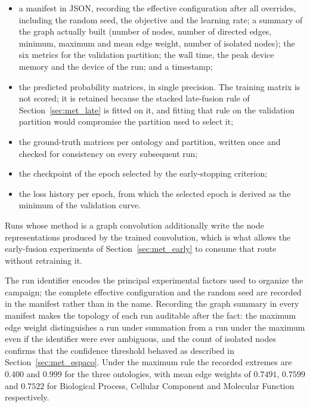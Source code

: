 \documentclass[Ingles]{ic-tese-v3}
\begin{document}
\begin{appendices}{}
\begin{itemize}
  \item a manifest in JSON, recording the effective configuration after all overrides, including the
        random seed, the objective and the learning rate; a summary of the graph actually built
        (number of nodes, number of directed edges, minimum, maximum and mean edge weight, number of
        isolated nodes); the six metrics for the validation partition; the wall time, the peak device
        memory and the device of the run; and a timestamp;
  \item the predicted probability matrices, in single precision. The training matrix is not scored;
        it is retained because the stacked late-fusion rule of Section~\ref{sec:met_late} is fitted
        on it, and fitting that rule on the validation partition would compromise the partition used
        to select it;
  \item the ground-truth matrices per ontology and partition, written once and checked for
        consistency on every subsequent run;
  \item the checkpoint of the epoch selected by the early-stopping criterion;
  \item the loss history per epoch, from which the selected epoch is derived as the minimum
        of the validation curve.
\end{itemize}

Runs whose method is a graph convolution additionally write the node representations produced by the
trained convolution, which is what allows the early-fusion experiments of Section~\ref{sec:met_early}
to consume that route without retraining it.

The run identifier encodes the principal experimental factors used to organize the campaign; the
complete effective configuration and the random seed are recorded in the manifest rather than in the
name. Recording the graph summary in every manifest makes the topology of each run auditable after
the fact: the maximum edge weight distinguishes a run under summation from a run under the maximum
even if the identifier were ever ambiguous, and the count of isolated nodes confirms that the
confidence threshold behaved as described in Section~\ref{sec:met_espaco}. Under the maximum rule the
recorded extremes are $0.400$ and $0.999$ for the three ontologies, with mean edge weights of
$0.7491$, $0.7599$ and $0.7522$ for Biological Process, Cellular Component and Molecular Function
respectively.


\end{appendices}
\end{document}
